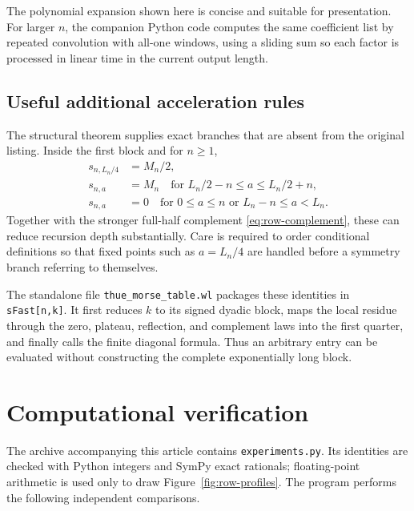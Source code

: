 \documentclass[11pt,oneside]{article}
\numberwithin{equation}{section}
\theoremstyle{definition}
\theoremstyle{remark}
\begin{document}
The polynomial expansion shown here is concise and suitable for presentation.
For larger \(n\), the companion Python code computes the same coefficient list
by repeated convolution with all-one windows, using a sliding sum so each
factor is processed in linear time in the current output length.

\subsection{Useful additional acceleration rules}

The structural theorem supplies exact branches that are absent from the
original listing.  Inside the first block and for \(n\ge1\),
\begin{align}
 s_{n,L_n/4}&=M_n/2,
 \label{eq:wl-quarter-rule}\\
 s_{n,a}&=M_n
 \quad\text{for }L_n/2-n\le a\le L_n/2+n,
 \label{eq:wl-plateau-rule}\\
 s_{n,a}&=0
 \quad\text{for }0\le a\le n
 \text{ or }L_n-n\le a<L_n.
 \label{eq:wl-zero-rule}
\end{align}
Together with the stronger full-half complement
\eqref{eq:row-complement}, these can reduce recursion depth substantially.
Care is required to order conditional definitions so that fixed points such as
\(a=L_n/4\) are handled before a symmetry branch referring to themselves.

The standalone file \texttt{thue\_morse\_table.wl} packages these identities in
\texttt{sFast[n,k]}.  It first reduces \(k\) to its signed dyadic block, maps the
local residue through the zero, plateau, reflection, and complement laws into the
first quarter, and finally calls the finite diagonal formula.  Thus an arbitrary
entry can be evaluated without constructing the complete exponentially long block.

\section{Computational verification}

The archive accompanying this article contains
\texttt{experiments.py}.  Its identities are checked with Python integers and
SymPy exact rationals; floating-point arithmetic is used only to draw
Figure~\ref{fig:row-profiles}.  The program performs the following independent
comparisons.
\end{document}
